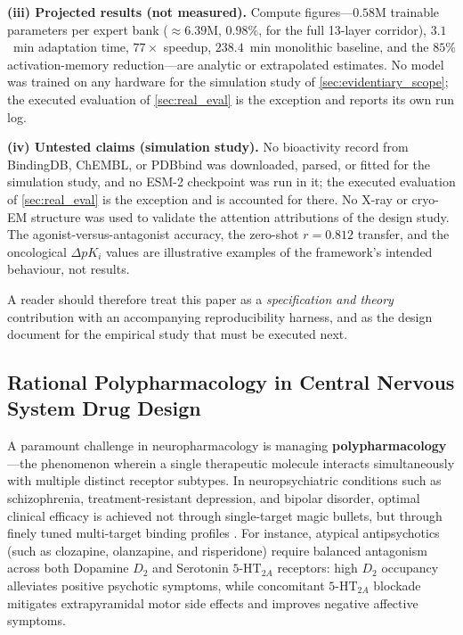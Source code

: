 \documentclass{article}
\theoremstyle{definition}
\begin{document}
\textbf{(iii) Projected results (not measured).} Compute figures---$0.58$M trainable parameters per expert bank ($\approx 6.39$M, $0.98\%$, for the full 13-layer corridor), $3.1$~min adaptation time, $77\times$ speedup, $238.4$~min monolithic baseline, and the $85\%$ activation-memory reduction---are analytic or extrapolated estimates. No model was trained on any hardware for the simulation study of \cref{sec:evidentiary_scope}; the executed evaluation of \cref{sec:real_eval} is the exception and reports its own run log.

\textbf{(iv) Untested claims (simulation study).} No bioactivity record from BindingDB, ChEMBL, or PDBbind was downloaded, parsed, or fitted for the simulation study, and no ESM-2 checkpoint was run in it; the executed evaluation of \cref{sec:real_eval} is the exception and is accounted for there. No X-ray or cryo-EM structure was used to validate the attention attributions of the design study. The agonist-versus-antagonist accuracy, the zero-shot $r = 0.812$ transfer, and the oncological $\Delta pK_i$ values are illustrative examples of the framework's intended behaviour, not results.

A reader should therefore treat this paper as a \emph{specification and theory} contribution with an accompanying reproducibility harness, and as the design document for the empirical study that must be executed next.

\subsection{Rational Polypharmacology in Central Nervous System Drug Design}
A paramount challenge in neuropharmacology is managing \textbf{polypharmacology}---the phenomenon wherein a single therapeutic molecule interacts simultaneously with multiple distinct receptor subtypes. In neuropsychiatric conditions such as schizophrenia, treatment-resistant depression, and bipolar disorder, optimal clinical efficacy is achieved not through single-target magic bullets, but through finely tuned multi-target binding profiles \citep{wang2018structure,kimura2019structures}. For instance, atypical antipsychotics (such as clozapine, olanzapine, and risperidone) require balanced antagonism across both Dopamine $D_2$ and Serotonin $5\text{-HT}_{2A}$ receptors: high $D_2$ occupancy alleviates positive psychotic symptoms, while concomitant $5\text{-HT}_{2A}$ blockade mitigates extrapyramidal motor side effects and improves negative affective symptoms.
\end{document}
